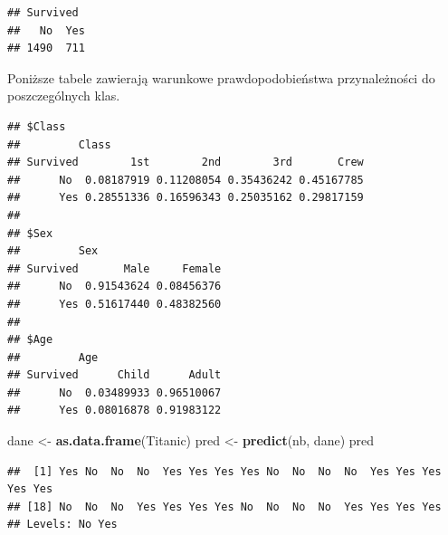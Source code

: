 \documentclass[]{book}
\newenvironment{Shaded}{\begin{snugshade}}{\end{snugshade}}
\newcommand{\DataTypeTok}[1]{\textcolor[rgb]{0.13,0.29,0.53}{#1}}
\newcommand{\KeywordTok}[1]{\textcolor[rgb]{0.13,0.29,0.53}{\textbf{#1}}}
\newcommand{\NormalTok}[1]{#1}
\newcommand{\OperatorTok}[1]{\textcolor[rgb]{0.81,0.36,0.00}{\textbf{#1}}}
\newcommand{\StringTok}[1]{\textcolor[rgb]{0.31,0.60,0.02}{#1}}
\theoremstyle{plain}
\theoremstyle{definition}
\theoremstyle{definition}
\theoremstyle{definition}
\theoremstyle{definition}
\theoremstyle{remark}
\begin{document}
\begin{Shaded}
\end{Shaded}

\begin{verbatim}
## Survived
##   No  Yes 
## 1490  711
\end{verbatim}

Poniższe tabele zawierają warunkowe prawdopodobieństwa przynależności do poszczególnych klas.

\begin{Shaded}
\end{Shaded}

\begin{verbatim}
## $Class
##         Class
## Survived        1st        2nd        3rd       Crew
##      No  0.08187919 0.11208054 0.35436242 0.45167785
##      Yes 0.28551336 0.16596343 0.25035162 0.29817159
## 
## $Sex
##         Sex
## Survived       Male     Female
##      No  0.91543624 0.08456376
##      Yes 0.51617440 0.48382560
## 
## $Age
##         Age
## Survived      Child      Adult
##      No  0.03489933 0.96510067
##      Yes 0.08016878 0.91983122
\end{verbatim}

\begin{Shaded}
\begin{Highlighting}[]
\NormalTok{dane <-}\StringTok{ }\KeywordTok{as.data.frame}\NormalTok{(Titanic)}
\NormalTok{pred <-}\StringTok{ }\KeywordTok{predict}\NormalTok{(nb, dane)}
\NormalTok{pred}
\end{Highlighting}
\end{Shaded}

\begin{verbatim}
##  [1] Yes No  No  No  Yes Yes Yes Yes No  No  No  No  Yes Yes Yes Yes Yes
## [18] No  No  No  Yes Yes Yes Yes No  No  No  No  Yes Yes Yes Yes
## Levels: No Yes
\end{verbatim}

\begin{Shaded}
\end{Shaded}
\end{document}
